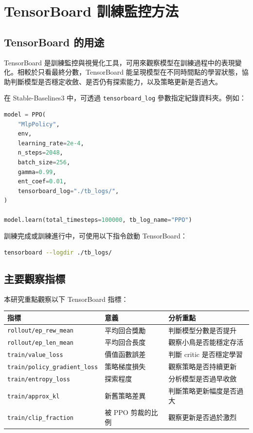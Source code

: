 \documentclass[12pt,a4paper]{ctexart}
\begin{document}
\section{TensorBoard 訓練監控方法}

\subsection{TensorBoard 的用途}

TensorBoard 是訓練監控與視覺化工具，可用來觀察模型在訓練過程中的表現變化。相較於只看最終分數，TensorBoard 能呈現模型在不同時間點的學習狀態，協助判斷模型是否穩定收斂、是否仍有探索能力，以及策略更新是否過大。

在 Stable-Baselines3 中，可透過 \texttt{tensorboard\_log} 參數指定紀錄資料夾。例如：

\begin{lstlisting}[language=Python]
model = PPO(
    "MlpPolicy",
    env,
    learning_rate=2e-4,
    n_steps=2048,
    batch_size=256,
    gamma=0.99,
    ent_coef=0.01,
    tensorboard_log="./tb_logs/",
)

model.learn(total_timesteps=100000, tb_log_name="PPO")
\end{lstlisting}

訓練完成或訓練進行中，可使用以下指令啟動 TensorBoard：

\begin{lstlisting}[language=bash]
tensorboard --logdir ./tb_logs/
\end{lstlisting}

\subsection{主要觀察指標}

本研究重點觀察以下 TensorBoard 指標：

\begin{longtable}{lll}
\toprule
指標 & 意義 & 分析重點 \\
\midrule
\endhead
\texttt{rollout/ep\_rew\_mean} & 平均回合獎勵 & 判斷模型分數是否提升 \\
\texttt{rollout/ep\_len\_mean} & 平均回合長度 & 觀察小鳥是否能穩定存活 \\
\texttt{train/value\_loss} & 價值函數誤差 & 判斷 critic 是否穩定學習 \\
\texttt{train/policy\_gradient\_loss} & 策略梯度損失 & 觀察策略是否持續更新 \\
\texttt{train/entropy\_loss} & 探索程度 & 分析模型是否過早收斂 \\
\texttt{train/approx\_kl} & 新舊策略差異 & 判斷策略更新幅度是否過大 \\
\texttt{train/clip\_fraction} & 被 PPO 剪裁的比例 & 觀察更新是否過於激烈 \\
\bottomrule
\end{longtable}
\end{document}
